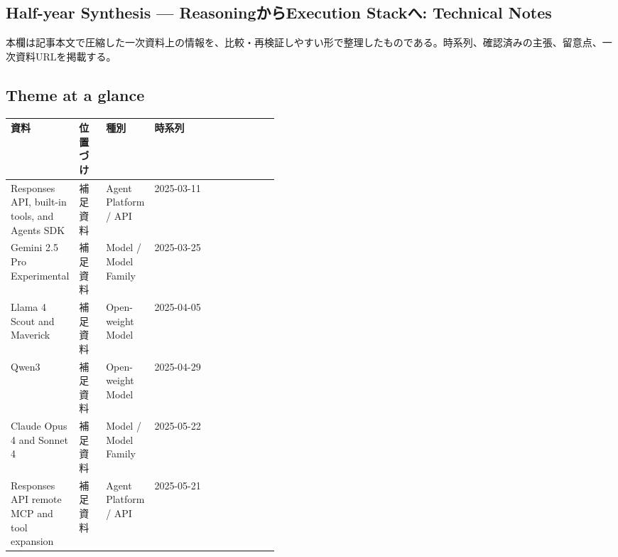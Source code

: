 \subsection*{Half-year Synthesis — ReasoningからExecution Stackへ: Technical Notes}
本欄は記事本文で圧縮した一次資料上の情報を、比較・再検証しやすい形で整理したものである。時系列、確認済みの主張、留意点、一次資料URLを掲載する。
\medskip
\subsection*{Theme at a glance}
\begin{center}
\footnotesize
\begin{tabularx}{\linewidth}{@{}p{0.20\linewidth}p{0.10\linewidth}p{0.14\linewidth}X@{}}
\toprule
資料 & 位置づけ & 種別 & 時系列 \\
\midrule
Responses API, built-in tools, and Agents SDK & 補足資料 & Agent Platform / API & 2025-03-11   \\
Gemini 2.5 Pro Experimental & 補足資料 & Model / Model Family & 2025-03-25   \\
Llama 4 Scout and Maverick & 補足資料 & Open-weight Model & 2025-04-05   \\
Qwen3 & 補足資料 & Open-weight Model & 2025-04-29   \\
Claude Opus 4 and Sonnet 4 & 補足資料 & Model / Model Family & 2025-05-22   \\
Responses API remote MCP and tool expansion & 補足資料 & Agent Platform / API & 2025-05-21   \\
\bottomrule
\end{tabularx}
\end{center}
\normalsize

